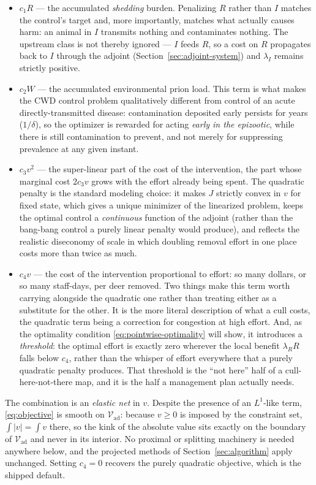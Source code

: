\documentclass[11pt]{article}
\newcommand{\Vad}{\mathcal{V}_{\mathrm{ad}}}
\begin{document}
\begin{itemize}
\item $c_1 R$ --- the accumulated \emph{shedding} burden. Penalizing $R$ rather than $I$ matches the control's target and, more importantly, matches what actually causes harm: an animal in $I$ transmits nothing and contaminates nothing. The upstream class is not thereby ignored --- $I$ feeds $R$, so a cost on $R$ propagates back to $I$ through the adjoint (Section~\ref{sec:adjoint-system}) and $\lambda_I$ remains strictly positive.
\item $c_2 W$ --- the accumulated environmental prion load. This term is what makes the CWD control problem qualitatively different from control of an acute directly-transmitted disease: contamination deposited early persists for years ($1/\delta$), so the optimizer is rewarded for acting \emph{early in the epizootic}, while there is still contamination to prevent, and not merely for suppressing prevalence at any given instant.
\item $c_3 v^2$ --- the super-linear part of the cost of the intervention, the part whose marginal cost $2c_3v$ grows with the effort already being spent. The quadratic penalty is the standard modeling choice: it makes $J$ strictly convex in $v$ for fixed state, which gives a unique minimizer of the linearized problem, keeps the optimal control a \emph{continuous} function of the adjoint (rather than the bang-bang control a purely linear penalty would produce), and reflects the realistic diseconomy of scale in which doubling removal effort in one place costs more than twice as much.
\item $c_4 v$ --- the cost of the intervention proportional to effort: so many dollars, or so many staff-days, per deer removed. Two things make this term worth carrying alongside the quadratic one rather than treating either as a substitute for the other. It is the more literal description of what a cull costs, the quadratic term being a correction for congestion at high effort. And, as the optimality condition \eqref{eq:pointwise-optimality} will show, it introduces a \emph{threshold}: the optimal effort is exactly zero wherever the local benefit $\lambda_R R$ falls below $c_4$, rather than the whisper of effort everywhere that a purely quadratic penalty produces. That threshold is the ``not here'' half of a cull-here-not-there map, and it is the half a management plan actually needs.
\end{itemize}
The combination is an \emph{elastic net} in $v$. Despite the presence of an $L^1$-like term, \eqref{eq:objective} is smooth on $\Vad$: because $v\ge0$ is imposed by the constraint set, $\int|v| = \int v$ there, so the kink of the absolute value sits exactly on the boundary of $\Vad$ and never in its interior. No proximal or splitting machinery is needed anywhere below, and the projected methods of Section~\ref{sec:algorithm} apply unchanged. Setting $c_4=0$ recovers the purely quadratic objective, which is the shipped default.
\end{document}

